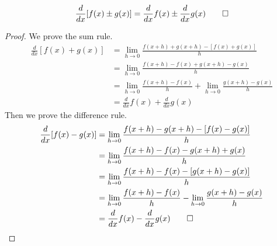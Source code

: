 \begin{theorem}
    \[\frac{d}{dx}[f(x)\pm g(x)]
    =\frac{d}{dx}f(x)\pm \frac{d}{dx}g(x) \qedhere\]
\end{theorem}
\begin{proof}
    We prove the sum rule.
    \begin{align*}
        \frac{d}{dx}[f(x)+g(x)]
        &= \lim_{h\to 0}\frac{f(x+h)+g(x+h)-[f(x)+g(x)]}{h} \\
        &= \lim_{h\to 0}\frac{f(x+h)-f(x)+g(x+h)-g(x)}{h} \\
        &= \lim_{h\to 0}\frac{f(x+h)-f(x)}{h}
        +\lim_{h\to 0}\frac{g(x+h)-g(x)}{h} \\
        &= \frac{d}{dx}f(x)+\frac{d}{dx}g(x)
    \end{align*}
    Then we prove the difference rule.
    \begin{align*}
        \frac{d}{dx}[f(x)-g(x)]
        &= \lim_{h\to 0}\frac{f(x+h)-g(x+h)-[f(x)-g(x)]}{h} \\
        &= \lim_{h\to 0}\frac{f(x+h)-f(x)-g(x+h)+g(x)}{h} \\
        &= \lim_{h\to 0}\frac{f(x+h)-f(x)-[g(x+h)-g(x)]}{h} \\
        &= \lim_{h\to 0}\frac{f(x+h)-f(x)}{h}
        -\lim_{h\to 0}\frac{g(x+h)-g(x)}{h} \\
        &= \frac{d}{dx}f(x)-\frac{d}{dx}g(x) \qedhere
    \end{align*}
\end{proof}

